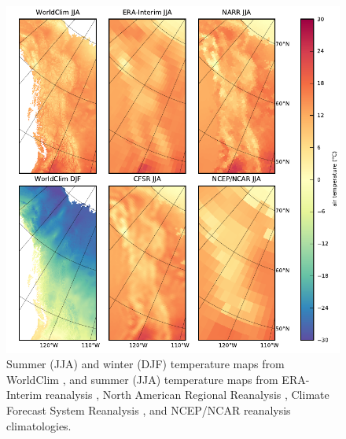 \documentclass[tc, ms]{copernicus}
\begin{document}
\begin{figure}
  \includegraphics{cordillera-climate-temp}
  \caption{Summer (JJA) and winter (DJF) temperature maps from WorldClim \citep{data:worldclim}, and summer (JJA) temperature maps from ERA-Interim reanalysis \citep{data:erai}, North American Regional Reanalysis \citep[NARR;][]{data:narr}, Climate Forecast System Reanalysis \citep[CFSR;][]{data:cfsr}, and NCEP/NCAR reanalysis \citep{data:ncar} climatologies.}
  \label{fig:temp}
\end{figure}
\end{document}
